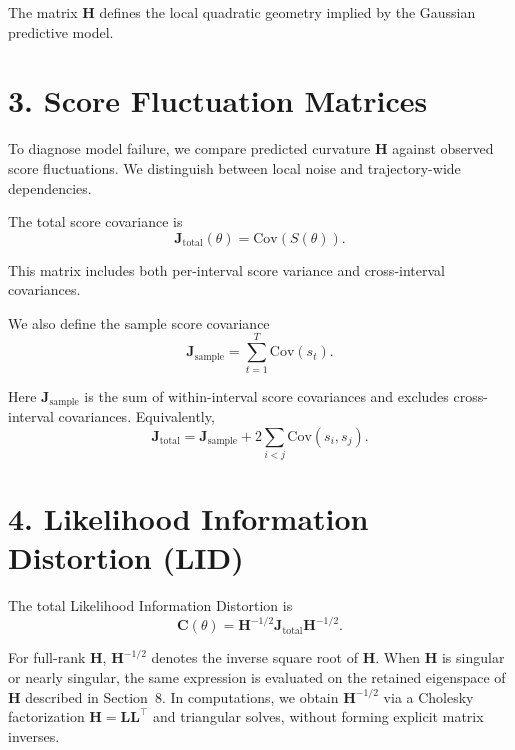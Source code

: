 \documentclass[11pt]{article}
\begin{document}
The matrix $\mathbf H$ defines the local quadratic geometry implied by the Gaussian predictive model.

\section*{3. Score Fluctuation Matrices}

To diagnose model failure, we compare predicted curvature $\mathbf H$ against observed score fluctuations. We distinguish between local noise and trajectory-wide dependencies.

The total score covariance is
\begin{equation}
\mathbf J_{\mathrm{total}}(\theta)
=
\mathrm{Cov}\!\left(S(\theta)\right).
\end{equation}

This matrix includes both per-interval score variance and cross-interval covariances.

We also define the sample score covariance
\begin{equation}
\mathbf J_{\mathrm{sample}}
=
\sum_{t=1}^T \mathrm{Cov}(s_t).
\end{equation}

Here $\mathbf J_{\mathrm{sample}}$ is the sum of within-interval score covariances and excludes cross-interval covariances. Equivalently,
\begin{equation}
\mathbf J_{\mathrm{total}}
=
\mathbf J_{\mathrm{sample}} + 2\sum_{i<j}\mathrm{Cov}(s_i,s_j).
\end{equation}

\section*{4. Likelihood Information Distortion (LID)}

The total Likelihood Information Distortion is
\begin{equation}
\mathbf C(\theta)
=
\mathbf H^{-1/2}
\mathbf J_{\mathrm{total}}
\mathbf H^{-1/2}.
\end{equation}

For full-rank $\mathbf H$, $\mathbf H^{-1/2}$ denotes the inverse square root of $\mathbf H$.
When $\mathbf H$ is singular or nearly singular, the same expression is evaluated on the retained eigenspace of $\mathbf H$ described in Section~8.
In computations, we obtain $\mathbf H^{-1/2}$ via a Cholesky factorization
$\mathbf H = \mathbf L \mathbf L^\top$ and triangular solves, without forming explicit matrix inverses.
\end{document}
